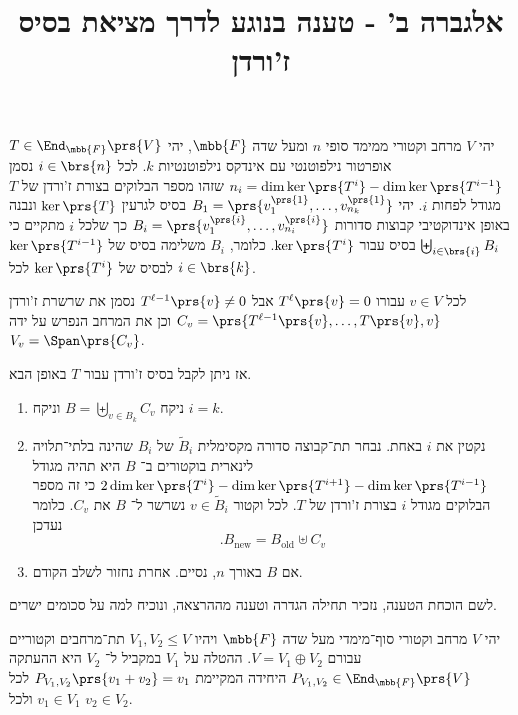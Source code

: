 \documentclass[a4paper,10pt,twoside,openany]{article}
\title{
אלגברה ב' - טענה בנוגע לדרך מציאת בסיס ז'ורדן
}
\date{}
\begin{document}
\maketitle

\begin{propositionstarred}
יהי
$V$
מרחב וקטורי ממימד סופי $n$ ומעל שדה
$\mbb{F}$,
יהי
$T \in \End_{\mbb{F}}\prs{V}$
אופרטור נילפוטנטי עם אינדקס נילפוטנטיות
$k$.
לכל
$i \in \brs{n}$
נסמן
$n_i = \dim \ker\prs{T^i} - \dim \ker\prs{T^{i-1}}$
שזהו מספר הבלוקים בצורת ז'ורדן של
$T$
מגודל לפחות
$i$.
יהי
$B_1 = \prs{v^{\prs{1}}_1, \ldots, v^{\prs{1}}_{n_k}}$
בסיס לגרעין
$\ker\prs{T}$
ונבנה באופן אינדוקטיבי קבוצות סדורות
$B_i = \prs{v^{\prs{i}}_1, \ldots, v^{\prs{i}}_{n_i}}$
כך שלכל
$i$
מתקיים כי
$\biguplus_{i \in \brs{i}} B_i$
בסיס עבור
$\ker\prs{T^i}$.
כלומר,
$B_i$
משלימה בסיס של
$\ker\prs{T^{i-1}}$
לבסיס של
$\ker\prs{T^i}$
לכל
$i \in \brs{k}$.

לכל
$v \in V$
עבורו
$T^\ell\prs{v} = 0$
אבל
$T^{\ell - 1}\prs{v} \neq 0$
נסמן את שרשרת ז'ורדן
$C_v = \prs{T^{\ell-1}\prs{v}, \ldots, T\prs{v}, v}$
וכן את המרחב הנפרש על ידה
$V_v = \Span\prs{C_v}$.

אז ניתן לקבל בסיס ז'ורדן עבור
$T$
באופן הבא.

\begin{enumerate}
\item
ניקח
$B = \biguplus_{v \in B_k} C_v$
וניקח
$i = k$.

\item
נקטין את
$i$
באחת.
נבחר תת־קבוצה סדורה מקסימלית
$\tilde{B}_i$
של
$B_i$
שהינה בלתי־תלויה לינארית בוקטורים ב־%
$B$
היא תהיה מגודל
$2\dim \ker\prs{T^i} - \dim\ker\prs{T^{i+1}} - \dim\ker\prs{T^{i-1}}$ כי זה מספר הבלוקים מגודל $i$ בצורת ז'ורדן של $T$.
לכל וקטור
$v \in \tilde{B}_i$
נשרשר ל־%
$B$
את
$C_v$.
כלומר נעדכן
\[\text{.} B_{\text{new}} = B_{\text{old}} \uplus C_v\]

\item
אם
$B$
באורך
$n$,
נסיים. אחרת נחזור לשלב הקודם.
\end{enumerate}

\end{propositionstarred}

לשם הוכחת הטענה, נזכיר תחילה הגדרה וטענה מההרצאה, ונוכיח למה על סכומים ישרים.

\begin{definition}
יהי
$V$
מרחב וקטורי סוף־מימדי מעל שדה $\mbb{F}$ ויהיו
$V_1, V_2 \leq V$
תת־מרחבים וקטוריים עבורם
$V = V_1 \oplus V_2$.
ההטלה על
$V_1$
במקביל ל־%
$V_2$
היא ההעתקה
$P_{V_1, V_2} \in \End_{\mbb{F}}\prs{V}$
היחידה המקיימת
$P_{V_1, V_2}\prs{v_1 + v_2} = v_1$
לכל
$v_1 \in V_1$
ולכל
$v_2 \in V_2$.
\end{definition}
\end{document}
